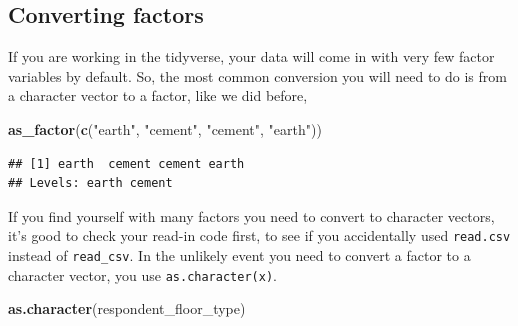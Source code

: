 \documentclass[]{book}
\newenvironment{Shaded}{\begin{snugshade}}{\end{snugshade}}
\newcommand{\KeywordTok}[1]{\textcolor[rgb]{0.13,0.29,0.53}{\textbf{#1}}}
\newcommand{\StringTok}[1]{\textcolor[rgb]{0.31,0.60,0.02}{#1}}
\newcommand{\NormalTok}[1]{#1}
\begin{document}
\subsection{Converting factors}\label{converting-factors}

If you are working in the tidyverse, your data will come in with very
few factor variables by default. So, the most common conversion you will
need to do is from a character vector to a factor, like we did before,

\begin{Shaded}
\begin{Highlighting}[]
\KeywordTok{as_factor}\NormalTok{(}\KeywordTok{c}\NormalTok{(}\StringTok{"earth"}\NormalTok{, }\StringTok{"cement"}\NormalTok{, }\StringTok{"cement"}\NormalTok{, }\StringTok{"earth"}\NormalTok{))}
\end{Highlighting}
\end{Shaded}

\begin{verbatim}
## [1] earth  cement cement earth 
## Levels: earth cement
\end{verbatim}

If you find yourself with many factors you need to convert to character
vectors, it's good to check your read-in code first, to see if you
accidentally used \texttt{read.csv} instead of \texttt{read\_csv}. In
the unlikely event you need to convert a factor to a character vector,
you use \texttt{as.character(x)}.

\begin{Shaded}
\begin{Highlighting}[]
\KeywordTok{as.character}\NormalTok{(respondent_floor_type)}
\end{Highlighting}
\end{Shaded}
\end{document}
